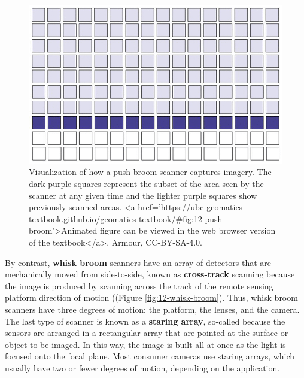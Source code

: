 \documentclass[
]{book}
\begin{document}
\begin{figure}
\includegraphics[width=0.9\linewidth]{images/12-push-broom} \caption{Visualization of how a push broom scanner captures imagery. The dark purple squares represent the subset of the area seen by the scanner at any given time and the lighter purple squares show previously scanned areas. <a href='https://ubc-geomatics-textbook.github.io/geomatics-textbook/#fig:12-push-broom'>Animated figure can be viewed in the web browser version of the textbook</a>. Armour, CC-BY-SA-4.0.}\label{fig:12-push-broom}
\end{figure}

By contrast, \textbf{whisk broom} scanners have an array of detectors that are mechanically moved from side-to-side, known as \textbf{cross-track} scanning because the image is produced by scanning across the track of the remote sensing platform direction of motion ((Figure \ref{fig:12-whisk-broom}). Thus, whisk broom scanners have three degrees of motion: the platform, the lenses, and the camera. The last type of scanner is known as a \textbf{staring array}, so-called because the sensors are arranged in a rectangular array that are pointed at the surface or object to be imaged. In this way, the image is built all at once as the light is focused onto the focal plane. Most consumer cameras use staring arrays, which usually have two or fewer degrees of motion, depending on the application.
\end{document}
